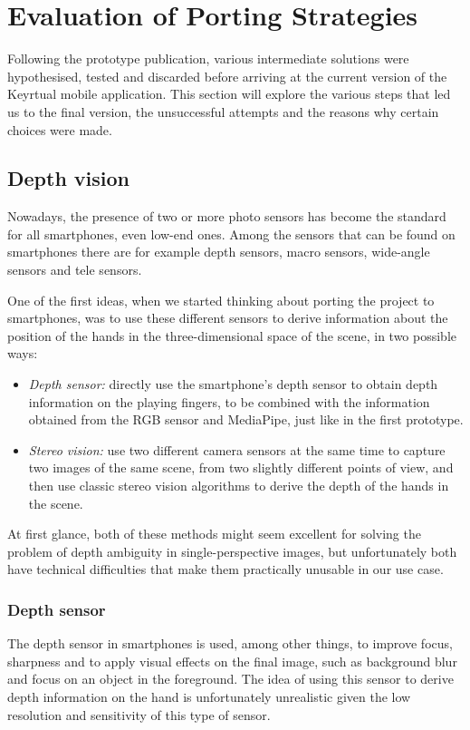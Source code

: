 \section{Evaluation of Porting Strategies}\label{sec:evaluation-of-porting-strategies}
Following the prototype publication, various intermediate solutions were hypothesised, tested and discarded
before arriving at the current version of the Keyrtual mobile application.
This section will explore the various steps that led us to the final version,
the unsuccessful attempts and the reasons why certain choices were made.

\subsection{Depth vision}\label{subsec:depth-vision}
Nowadays, the presence of two or more photo sensors has become the standard for all smartphones, even low-end ones.
Among the sensors that can be found on smartphones there are for example
depth sensors, macro sensors, wide-angle sensors and tele sensors.

One of the first ideas, when we started thinking about porting the project to smartphones,
was to use these different sensors to derive information about the position of the hands
in the three-dimensional space of the scene, in two possible ways:
\begin{itemize}
	\item \textit{Depth sensor:} directly use the smartphone's depth sensor to obtain depth information on the
	playing fingers, to be combined with the information obtained from the RGB sensor and MediaPipe,
	just like in the first prototype.
	\item \textit{Stereo vision:} use two different camera sensors at the same time to capture two images
	of the same scene, from two slightly different points of view, and then use classic stereo
	vision algorithms to derive the depth of the hands in the scene.
\end{itemize}

At first glance, both of these methods might seem excellent for solving the problem of depth
ambiguity in single-perspective images, but unfortunately both have technical
difficulties that make them practically unusable in our use case.

\subsubsection{Depth sensor}
The depth sensor in smartphones is used, among other things, to improve focus, sharpness and to apply visual
effects on the final image, such as background blur and focus on an object in the foreground.
The idea of using this sensor to derive depth information on the hand is unfortunately
unrealistic given the low resolution and sensitivity of this type of sensor.

